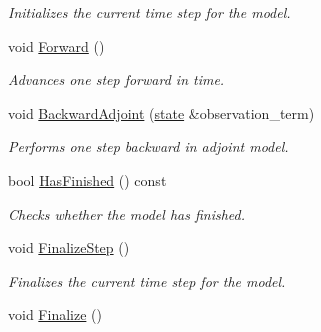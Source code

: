 \documentclass{tufte-book}
\begin{document}
\begin{DoxyCompactItemize}
\begin{DoxyCompactList}\small\item\em \-Initializes the current time step for the model. \end{DoxyCompactList}\item
void \hyperlink{class_verdandi_1_1_model_template_ae5ee9df8c20641f4cda9db782fdf6af8}{\-Forward} ()
\begin{DoxyCompactList}\small\item\em \-Advances one step forward in time. \end{DoxyCompactList}\item
void \hyperlink{class_verdandi_1_1_model_template_ae9fad4cbd97cfbe2dff2da24569997f7}{\-Backward\-Adjoint} (\hyperlink{class_verdandi_1_1_model_template_a6bb9efb7898f067bb21780159b497ba7}{state} \&observation\-\_\-term)
\begin{DoxyCompactList}\small\item\em \-Performs one step backward in adjoint model. \end{DoxyCompactList}\item
bool \hyperlink{class_verdandi_1_1_model_template_a4aa54740408c0e5ef7e6b1c8a10a4c2d}{\-Has\-Finished} () const
\begin{DoxyCompactList}\small\item\em \-Checks whether the model has finished. \end{DoxyCompactList}\item
\hypertarget{class_verdandi_1_1_model_template_a180366edced1408d025f2fa8d8967f6c}{
void \hyperlink{class_verdandi_1_1_model_template_a180366edced1408d025f2fa8d8967f6c}{\-Finalize\-Step} ()}
\label{class_verdandi_1_1_model_template_a180366edced1408d025f2fa8d8967f6c}

\begin{DoxyCompactList}\small\item\em \-Finalizes the current time step for the model. \end{DoxyCompactList}\item
\hypertarget{class_verdandi_1_1_model_template_aa97fa8c00583e0bc8ca7eadef3378c50}{
void \hyperlink{class_verdandi_1_1_model_template_aa97fa8c00583e0bc8ca7eadef3378c50}{\-Finalize} ()}
\label{class_verdandi_1_1_model_template_aa97fa8c00583e0bc8ca7eadef3378c50}


\end{DoxyCompactItemize}
\end{document}
